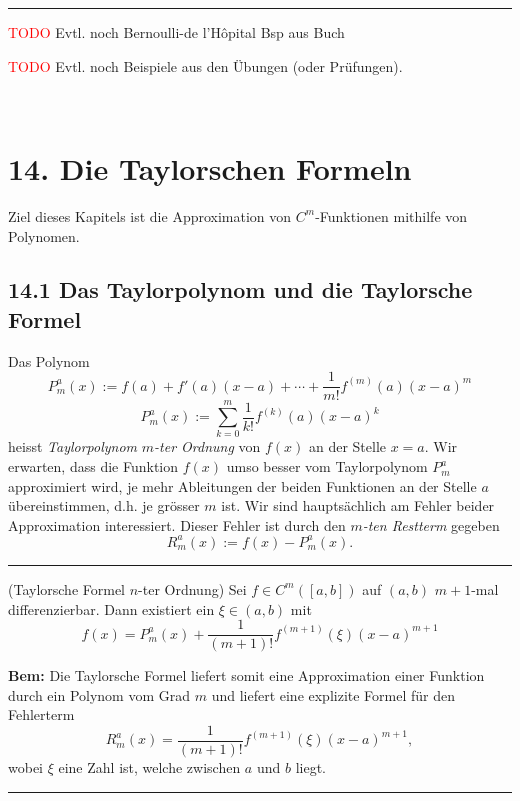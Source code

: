 \documentclass[a4paper,landscape,8pt]{extarticle}
\newcommand{\todo}{\textcolor{red}{TODO }}
\newcommand{\sep}{\vspace{5pt}\noindent\hrule\vspace{5pt}}
\newcommand{\Bem}{\textbf{Bem: }}
\renewcommand*{\newpage}{ \ }
\begin{document}
\begin{multicols*}{4}
\begin{warmup}
\sep

\todo Evtl. noch Bernoulli-de l'Hôpital Bsp aus Buch

\todo Evtl. noch Beispiele aus den Übungen (oder Prüfungen).
\end{warmup}

\newpage

\section{14. Die Taylorschen Formeln}

Ziel dieses Kapitels ist die Approximation von $C^m$-Funktionen mithilfe von
Polynomen.

\subsection{14.1 Das Taylorpolynom und die Taylorsche Formel}

\Def Das Polynom
\[
P^{a}_m	(x):= f(a) + f'(a)(x-a) + \cdots + \frac{1}{m!} f^{(m)}(a)(x-a)^m
\]
\[
P^{a}_m	(x):= \sum_{k=0}^m \frac{1}{k!} f^{(k)}(a) (x-a)^k
\]
heisst \emph{Taylorpolynom }$m$\emph{-ter Ordnung} von $f(x)$ an der Stelle
$x=a$. Wir erwarten, dass die Funktion $f(x)$ umso besser vom Taylorpolynom
$P^{a}_m$ approximiert wird, je mehr Ableitungen der beiden Funktionen an der
Stelle $a$ übereinstimmen, d.h. je grösser $m$ ist. Wir sind hauptsächlich am
Fehler beider Approximation interessiert.
Dieser Fehler ist durch den $m$\emph{-ten Restterm} gegeben
\[
R^{a}_m (x) := f(x)-P^{a}_m(x).
\]

\sep

\Satz (Taylorsche Formel $n$-ter Ordnung) Sei $f\in C^m([a,b])$ auf $(a,b)$
$m+1$-mal differenzierbar. Dann existiert ein $\xi\in(a,b)$ mit
\[
f(x) = P^{a}_m	(x) + \frac{1}{(m+1)!}f^{(m+1)}(\xi)(x-a)^{m+1}
\]

\Bem Die Taylorsche Formel liefert somit eine Approximation einer Funktion durch
ein Polynom vom Grad $m$ und liefert eine explizite Formel für den Fehlerterm
\[
R^{a}_m(x) = \frac{1}{(m+1)!}f^{(m+1)}(\xi)(x-a)^{m+1},
\]
wobei $\xi$ eine Zahl ist, welche zwischen $a$ und $b$ liegt.

\begin{warmup}
\sep


\end{warmup}
\end{multicols*}
\end{document}
